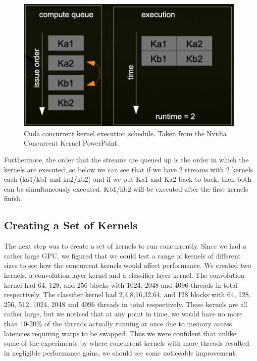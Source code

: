 \documentclass[sigconf]{acmart}
\begin{document}
\begin{figure}[h]
  \centering
  \includegraphics[width=\linewidth]{img/image6}
  \caption{Cuda concurrent kernel execution schedule. Taken from the Nvidia Concurrent Kernel PowerPoint. \cite{nvidia_concurrent}}
\end{figure}

Furthermore, the order that the streams are queued up is the order in which the kernels are executed, so below we can see that if we have 2 streams with 2 kernels each (ka1/kb1 and ka2/kb2) and if we put Ka1 and Ka2 back-to-back, then both can be simultaneously executed. Kb1/kb2 will be executed after the first kernels finish. 

\subsection{Creating a Set of Kernels	}
The next step was to create a set of kernels to run concurrently. Since we had a rather large GPU, we figured that we could test a range of kernels of different sizes to see how the concurrent kernels would affect performance. We created two kernels, a convolution layer kernel and a classifier layer kernel. The convolution kernel had 64, 128, and 256 blocks with 1024, 2048 and 4096 threads in total respectively. The classifier kernel had 2,4,8,16,32,64, and 128 blocks with 64, 128, 256, 512, 1024, 2048 and 4096 threads in total respectively. These kernels are all rather large, but we noticed that at any point in time, we would have no more than 10-20\% of the threads actually running at once due to memory access latencies requiring warps to be swapped. Thus we were confident that unlike some of the experiments by \cite{wende_cordes_steinke_2012} where concurrent kernels with more threads resulted in negligible performance gains, we should see some noticeable improvement. 
\end{document}
